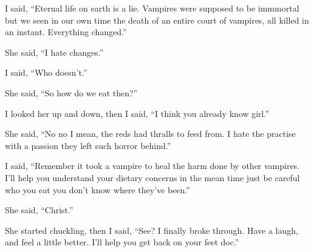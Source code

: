 I said, ``Eternal life on earth is a lie. Vampires were supposed to be immmortal but we seen in our own time the death of an entire court of vampires, all killed in an instant. Everything changed.''

She said, ``I hate changes.''

I said, ``Who doesn't.''

She said, ``So how do we eat then?''

I looked her up and down, then I said, ``I think you already know girl.''

She said, ``No no I mean, the reds had thralls to feed from. I hate the practise with a passion they left such horror behind.''

I said, ``Remember it took a vampire to heal the harm done by other vampires. I'll help you understand your dietary concerns in the mean time just be careful who you eat you don't know where they've been.''

She said, ``Christ.''

She started chuckling, then I said, ``See? I finally broke through. Have a laugh, and feel a little better. I'll help you get back on your feet doc.''


